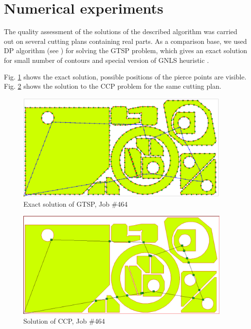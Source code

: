 \documentclass[]{llncs}
\begin{document}
\section{Numerical experiments}

The quality assessment of the solutions
of the described algorithm was carried out on several
cutting plans containing real parts.
As a comparison base, we used DP algorithm
(see \cite{bi15})
for solving the GTSP problem,
which gives an exact solution for small number of contours
and special version of GNLS heuristic \cite{GLNS}.

Fig. \ref{gtsp-path} shows the exact solution,
possible positions of the pierce points are visible.
Fig. \ref{ccp-path} shows the solution to the CCP problem
for the same cutting plan.

\begin{figure}
  \begin{center}
    \includegraphics[width=0.95\textwidth]{464-gtsp.png}
  \end{center}
  \caption{Exact solution of GTSP, Job \#464}
  \label{gtsp-path}
\end{figure}

\begin{figure}
  \begin{center}
    \includegraphics[width=0.95\textwidth]{464-ccp.png}
  \end{center}
  \caption{Solution of CCP, Job \#464}
  \label{ccp-path}
\end{figure}
\end{document}

